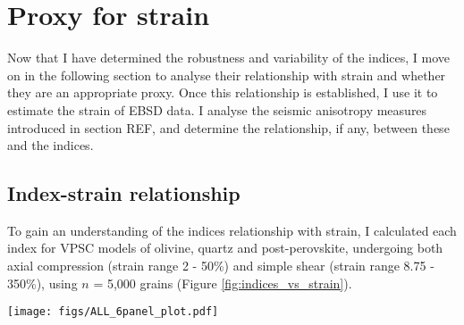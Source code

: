 \documentclass[a4paper,12pt,twoside]{report}
\numberwithin{equation}{chapter}
\begin{document}
\section{Proxy for strain}

Now that I have determined the robustness and variability of the indices, I move on in the following section to analyse their relationship with strain and whether they are an appropriate proxy. Once this relationship is established, I use it to estimate the strain of EBSD data. I analyse the seismic anisotropy measures introduced in section REF, and determine the relationship, if any, between these and the indices.   

\subsection{Index-strain relationship}

To gain an understanding of the indices relationship with strain, I calculated each index for VPSC models of olivine, quartz and post-perovskite, undergoing both axial compression (strain range 2 - 50\%) and simple shear (strain range 8.75 - 350\%), using $n$ = 5,000 grains (Figure \ref{fig:indices_vs_strain}).     

\begin{figure*}[p]
  \centering
    \texttt{[image: figs/ALL\_6panel\_plot.pdf]}
  \caption[Relation of indices to strain (VPSC)]{Relationship between the J-index, continuous M-index and discrete M-index to sample strain. Data are from VPSC models, with the indices calculated using the same 5,000 grains at each strain step (this many grains ensures the results are in the convergent regime). Discrete M-index calculated with a bin size of 0.25$^\circ$. \textbf{Top row} shows data for olivine, \textbf{middle row} shows quartz and \textbf{bottom row} shows post-perovskite (P-PS). \textbf{Left column} shows data from an axial compression VPSC model, the \textbf{right column} shows data from a simple shear VPSC model. Note the change of scale on both y-axes in \textbf{f}. Applying these scales to other plots reduces clarity --- consistent scales on all other plots (within each column) allows for useful comparison (see text).}
  \label{fig:indices_vs_strain}
\end{figure*} 
\end{document}
